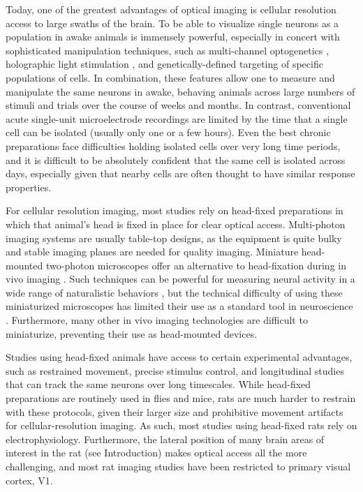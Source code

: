 Today, one of the greatest advantages of optical imaging is cellular resolution access to large swaths of the brain. To be able to visualize single neurons as a population in awake animals is immensely powerful, especially in concert with sophisticated manipulation techniques, such as multi-channel optogenetics \cite{REFREF}, holographic light stimulation \cite{REFREF}, and genetically-defined targeting of specific populations of cells. In combination, these features allow one to measure and manipulate the same neurons in awake, behaving animals across large numbers of stimuli and trials over the course of weeks and months. In contrast, conventional acute single-unit microelectrode recordings are limited by the time that a single cell can be isolated (usually only one or a few hours). Even the best chronic preparations face difficulties holding isolated cells over very long time periods, and it is difficult to be absolutely confident that the same cell is isolated across days, especially given that nearby cells are often thought to have similar response properties.

For cellular resolution imaging, most studies rely on head-fixed preparations in which that animal's head is fixed in place for clear optical access. Multi-photon imaging systems are usually table-top designs, as the equipment is quite bulky and stable imaging planes are needed for quality imaging. Miniature head-mounted two-photon microscopes offer an alternative to head-fixation during in vivo imaging \cite{Helmchen2001, Piyawattanametha2009, Sawinski2009}. Such techniques can be powerful for measuring neural activity in a wide range of naturalistic behaviors \cite{Sawinski2009}, but the technical difficulty of using these miniaturized microscopes has limited their use as a standard tool in neuroscience \cite{Kerr2012}. Furthermore, many other in vivo imaging technologies are difficult to miniaturize, preventing their use as head-mounted devices. 

Studies using head-fixed animals have access to certain experimental advantages, such as restrained movement, precise stimulus control, and longitudinal studies that can track the same neurons over long timescales. While head-fixed preparations are routinely used in flies and mice, rats are much harder to restrain with these protocols, given their larger size and prohibitive movement artifacts for cellular-resolution imaging. As such, most studies using head-fixed rats rely on electrophysiology. Furthermore, the lateral position of many brain areas of interest in the rat (see Introduction) makes optical access all the more challenging, and most rat imaging studies have been restricted to primary visual cortex, V1\cite{Greenberg2008, Ohki2005, Scott2018}.

